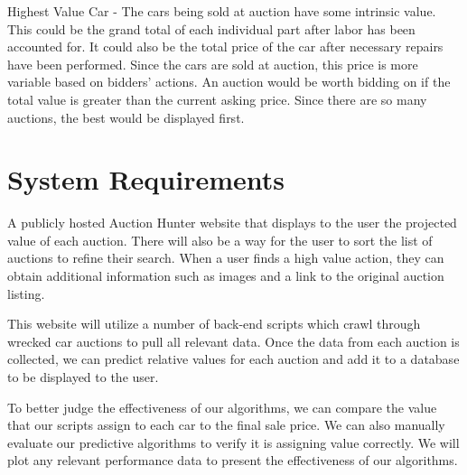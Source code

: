 \documentclass[onecolumn, draftclsnofoot,10pt, compsoc]{IEEEtran}
\begin{document}
Highest Value Car - The cars being sold at auction have some intrinsic value. This could be the grand total of each individual part after labor has been accounted for. It could also be the total price of the car after necessary repairs have been performed. Since the cars are sold at auction, this price is more variable based on bidders' actions. An auction would be worth bidding on if the total value is greater than the current asking price. Since there are so many auctions, the best would be displayed first. 

\section{System Requirements}
A publicly hosted Auction Hunter website that displays to the user the projected value of each auction. There will also be a way for the user to sort the list of auctions to refine their search. When a user finds a high value action, they can obtain additional information such as images and a link to the original auction listing. 

This website will utilize a number of back-end scripts which crawl through wrecked car auctions to pull all relevant data. Once the data from each auction is collected, we can predict relative values for each auction and add it to a database to be displayed to the user. 

To better judge the effectiveness of our algorithms, we can compare the value that our scripts assign to each car to the final sale price. We can also manually evaluate our predictive algorithms to verify it is assigning value correctly. We will plot any relevant performance data to present the effectiveness of our algorithms.  

\end{document}

